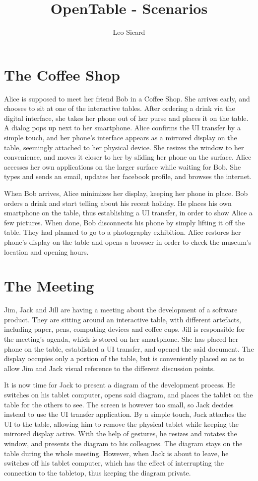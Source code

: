 \documentclass[11pt]{amsart}
\title{OpenTable - Scenarios}
\author{Leo Sicard}
\begin{document}
\maketitle

\section{The Coffee Shop}

Alice is supposed to meet her friend Bob in a Coffee Shop.
She arrives early, and chooses to sit at one of the interactive tables.
After ordering a drink via the digital interface, she takes her phone out of her purse and places it on the table.
A dialog pops up next to her smartphone.
Alice confirms the UI transfer by a simple touch, and her phone's interface appears as a mirrored display on the table, seemingly attached to her physical device.
She resizes the window to her convenience, and moves it closer to her by sliding her phone on the surface.
Alice accesses her own applications on the larger surface while waiting for Bob.
She types and sends an email, updates her facebook profile, and browses the internet.

When Bob arrives, Alice minimizes her display, keeping her phone in place.
Bob orders a drink and start telling about his recent holiday.
He places his own smartphone on the table, thus establishing a UI transfer, in order to show Alice a few pictures.
When done, Bob disconnects his phone by simply lifting it off the table.
They had planned to go to a photography exhibition.
Alice restores her phone's display on the table and opens a browser in order to check the museum's location and opening hours.

\section{The Meeting}

Jim, Jack and Jill are having a meeting about the development of a software product.
They are sitting around an interactive table, with different artefacts, including paper, pens, computing devices and coffee cups.
Jill is responsible for the meeting's agenda, which is stored on her smartphone.
She has placed her phone on the table, established a UI transfer, and opened the said document.
The display occupies only a portion of the table, but is conveniently placed so as to allow Jim and Jack visual reference to the different discussion points.

It is now time for Jack to present a diagram of the development process.
He switches on his tablet computer, opens said diagram, and places the tablet on the table for the others to see.
The screen is however too small, so Jack decides instead to use the UI transfer application.
By a simple touch, Jack attaches the UI to the table, allowing him to remove the physical tablet while keeping the mirrored display active.
With the help of gestures, he resizes and rotates the window, and presents the diagram to his colleagues.
The diagram stays on the table during the whole meeting.
However, when Jack is about to leave, he switches off his tablet computer, which has the effect of interrupting the connection to the tabletop, thus keeping the diagram private.
\end{document}
